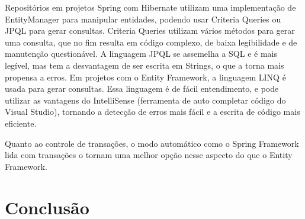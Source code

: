 \documentclass[a4paper,12pt]{article}
\begin{document}
Repositórios em projetos Spring com Hibernate utilizam uma implementação de EntityManager para manipular entidades, podendo usar Criteria Queries ou JPQL para gerar consultas. Criteria Queries utilizam vários métodos para gerar uma consulta, que no fim resulta em código complexo, de baixa legibilidade e de manutenção questionável. A linguagem JPQL se assemelha a SQL e é mais legível, mas tem a desvantagem de ser escrita em Strings, o que a torna mais propensa a erros. Em projetos com o Entity Framework, a linguagem LINQ é usada para gerar consultas. Essa linguagem é de fácil entendimento, e pode utilizar as vantagens do IntelliSense (ferramenta de auto completar código do Visual Studio), tornando a detecção de erros mais fácil e a escrita de código mais eficiente.

Quanto ao controle de transações, o modo automático como o Spring Framework lida com transações o tornam uma melhor opção nesse aspecto do que o Entity Framework. 

\newpage
\section{Conclusão}
\end{document}
